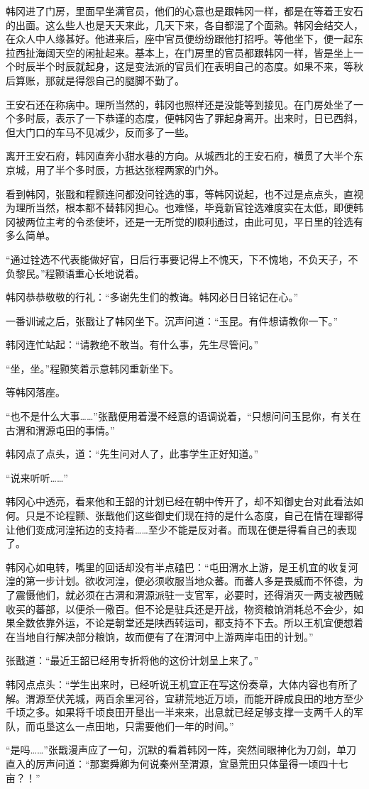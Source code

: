 韩冈进了门房，里面早坐满官员，他们的心意也是跟韩冈一样，都是在等着王安石的出面。这么些人也是天天来此，几天下来，各自都混了个面熟。韩冈会结交人，在众人中人缘甚好。他进来后，座中官员便纷纷跟他打招呼。等他坐下，便一起东拉西扯海阔天空的闲扯起来。基本上，在门房里的官员都跟韩冈一样，皆是坐上一个时辰半个时辰就起身，这是变法派的官员们在表明自己的态度。如果不来，等秋后算账，那就是得怨自己的腿脚不勤了。

王安石还在称病中。理所当然的，韩冈也照样还是没能等到接见。在门房处坐了一个多时辰，表示了一下恭谨的态度，便韩冈告了罪起身离开。出来时，日已西斜，但大门口的车马不见减少，反而多了一些。

离开王安石府，韩冈直奔小甜水巷的方向。从城西北的王安石府，横贯了大半个东京城，用了半个多时辰，方抵达张程两家的门外。

看到韩冈，张戬和程颢连问都没问铨选的事，等韩冈说起，也不过是点点头，直视为理所当然，根本都不替韩冈担心。也难怪，毕竟新官铨选难度实在太低，即便韩冈被两位主考的令丞使坏，还是一无所觉的顺利通过，由此可见，平日里的铨选有多么简单。

“通过铨选不代表能做好官，日后行事要记得上不愧天，下不愧地，不负天子，不负黎民。”程颢语重心长地说着。

韩冈恭恭敬敬的行礼：“多谢先生们的教诲。韩冈必日日铭记在心。”

一番训诫之后，张戬让了韩冈坐下。沉声问道：“玉昆。有件想请教你一下。”

韩冈连忙站起：“请教绝不敢当。有什么事，先生尽管问。”

“坐，坐。”程颢笑着示意韩冈重新坐下。

等韩冈落座。

“也不是什么大事……”张戬便用着漫不经意的语调说着，“只想问问玉昆你，有关在古渭和渭源屯田的事情。”

韩冈点了点头，道：“先生问对人了，此事学生正好知道。”

“说来听听……”

韩冈心中透亮，看来他和王韶的计划已经在朝中传开了，却不知御史台对此看法如何。只是不论程颢、张戬他们这些御史们现在持的是什么态度，自己在情在理都得让他们变成河湟拓边的支持者……至少不能是反对者。而现在便是得看自己的表现了。

韩冈心如电转，嘴里的回话却没有半点磕巴：“屯田渭水上游，是王机宜的收复河湟的第一步计划。欲收河湟，便必须收服当地众蕃。而蕃人多是畏威而不怀德，为了震慑他们，就必须在古渭和渭源派驻一支官军，必要时，还得消灭一两支被西贼收买的蕃部，以便杀一儆百。但不论是驻兵还是开战，物资粮饷消耗总不会少，如果全数依靠外运，不论是朝堂还是陕西转运司，都支持不下去。所以王机宜便想着在当地自行解决部分粮饷，故而便有了在渭河中上游两岸屯田的计划。”

张戬道：“最近王韶已经用专折将他的这份计划呈上来了。”

韩冈点点头：“学生出来时，已经听说王机宜正在写这份奏章，大体内容也有所了解。渭源至伏羌城，两百余里河谷，宜耕荒地近万顷，而能开辟成良田的地方至少千顷之多。如果将千顷良田开垦出一半来来，出息就已经足够支撑一支两千人的军队，而屯垦这么一点田地，只需要他们一年的时间。”

“是吗……”张戬漫声应了一句，沉默的看着韩冈一阵，突然间眼神化为刀剑，单刀直入的厉声问道：“那窦舜卿为何说秦州至渭源，宜垦荒田只体量得一顷四十七亩？！”

